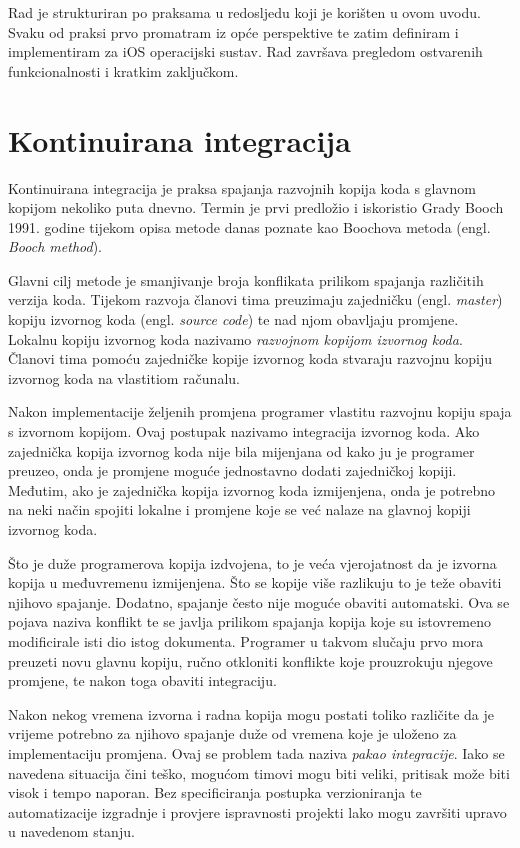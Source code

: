 \documentclass[times, utf8, diplomski, numeric]{fer}
\newcommand{\eng}[1]{(engl. \textit{#1})}
\begin{document}
Rad je strukturiran po praksama u redosljedu koji je korišten u ovom uvodu. Svaku od praksi prvo promatram iz opće perspektive te zatim definiram i implementiram za iOS operacijski sustav. Rad završava pregledom ostvarenih funkcionalnosti i kratkim zaključkom.


\chapter{Kontinuirana integracija} \label{header:Kontinuirana_Integracija}

Kontinuirana integracija je praksa spajanja razvojnih kopija koda s glavnom kopijom nekoliko puta dnevno. Termin je prvi predložio i iskoristio Grady Booch 1991. godine tijekom opisa metode danas poznate kao Boochova metoda \eng{Booch method}\citep{wiki:BoochMethod}.

Glavni cilj metode je smanjivanje broja konflikata prilikom spajanja različitih verzija koda. Tijekom razvoja članovi tima preuzimaju zajedničku \eng{master} kopiju izvornog koda \eng{source code} te nad njom obavljaju promjene. Lokalnu kopiju izvornog koda nazivamo \textit{razvojnom kopijom izvornog koda}. Članovi tima pomoću zajedničke kopije izvornog koda stvaraju razvojnu kopiju izvornog koda na vlastitiom računalu.

Nakon implementacije željenih promjena programer vlastitu razvojnu kopiju spaja s izvornom kopijom. Ovaj postupak nazivamo integracija izvornog koda. Ako zajednička kopija izvornog koda nije bila mijenjana od kako ju je programer preuzeo, onda je promjene moguće jednostavno dodati zajedničkoj kopiji. Međutim, ako je zajednička kopija izvornog koda izmijenjena, onda je potrebno na neki način spojiti lokalne i promjene koje se već nalaze na glavnoj kopiji izvornog koda.

Što je duže programerova kopija izdvojena, to je veća vjerojatnost da je izvorna kopija u međuvremenu izmijenjena. Što se kopije više razlikuju to je teže obaviti njihovo spajanje. Dodatno, spajanje često nije moguće obaviti automatski. Ova se pojava naziva konflikt te se javlja prilikom spajanja kopija koje su istovremeno modificirale isti dio istog dokumenta. Programer u takvom slučaju prvo mora preuzeti novu glavnu kopiju, ručno otkloniti konflikte koje prouzrokuju njegove promjene, te nakon toga obaviti integraciju.

Nakon nekog vremena izvorna i radna kopija mogu postati toliko različite da je vrijeme potrebno za njihovo spajanje duže od vremena koje je uloženo za implementaciju promjena. Ovaj se problem tada naziva \textit{pakao integracije}. Iako se navedena situacija čini teško, mogućom timovi mogu biti veliki, pritisak može biti visok i tempo naporan. Bez specificiranja postupka verzioniranja te automatizacije izgradnje i provjere ispravnosti projekti lako mogu završiti upravo u navedenom stanju.
\end{document}
